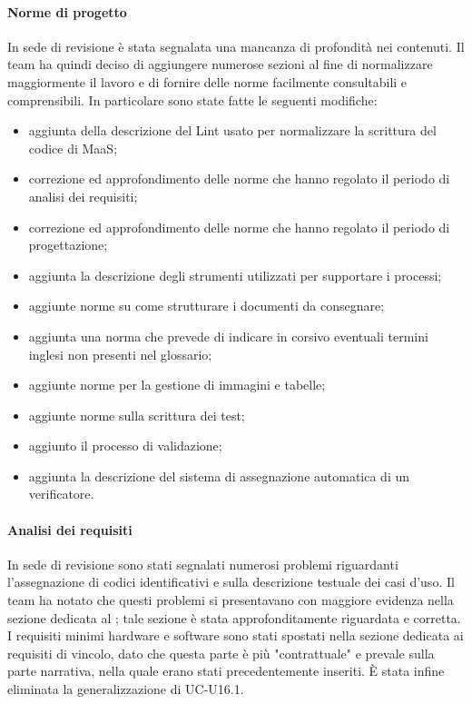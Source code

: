 \paragraph*{Norme di progetto}
In sede di revisione è stata segnalata una mancanza di profondità nei contenuti. Il team ha quindi deciso di aggiungere numerose sezioni al fine di normalizzare maggiormente il lavoro e di fornire delle norme facilmente consultabili e comprensibili. In particolare sono state fatte le seguenti modifiche:
\begin{itemize}
\item aggiunta della descrizione del Lint usato per normalizzare la scrittura del codice di MaaS;
\item correzione ed approfondimento delle norme che hanno regolato il periodo di analisi dei requisiti;
\item correzione ed approfondimento delle norme che hanno regolato il periodo di progettazione;
\item aggiunta la descrizione degli strumenti utilizzati per supportare i processi;
\item aggiunte norme su come strutturare i documenti da consegnare;
\item aggiunta una norma che prevede di indicare in corsivo eventuali termini inglesi non presenti nel glossario;
\item aggiunte norme per la gestione di immagini e tabelle;
\item aggiunte norme sulla scrittura dei test;
\item aggiunto il processo di validazione;
\item aggiunta la descrizione del sistema di assegnazione automatica di un verificatore.
\end{itemize}

\paragraph*{Analisi dei requisiti}
In sede di revisione sono stati segnalati numerosi problemi riguardanti l'assegnazione di codici identificativi e sulla descrizione testuale dei casi d'uso. Il team ha notato che questi problemi si presentavano con maggiore evidenza nella sezione dedicata al ; tale sezione è stata approfonditamente riguardata e corretta. I requisiti minimi hardware e software sono stati spostati nella sezione dedicata ai requisiti di vincolo, dato che questa parte è più "contrattuale" e prevale sulla parte narrativa, nella quale erano stati precedentemente inseriti. È stata infine eliminata la generalizzazione di UC-U16.1.

